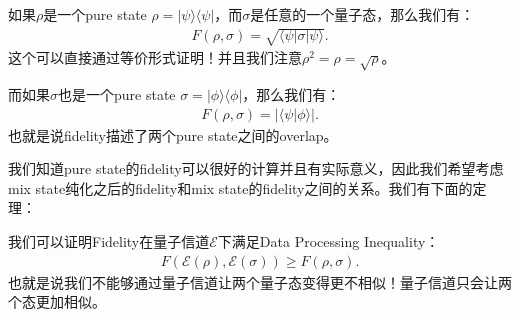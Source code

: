   \bigskip

  如果$ \rho $是一个pure state $ \rho = |\psi\rangle\langle\psi| $，而$
  \sigma $是任意的一个量子态，那么我们有：
  \begin{align}
    F(\rho,\sigma) = \sqrt{\langle\psi|\sigma|\psi\rangle}.
  \end{align}
  这个可以直接通过等价形式证明！并且我们注意$ \rho^2 = \rho = \sqrt{\rho} $。

  而如果$ \sigma $也是一个pure state $ \sigma = |\phi\rangle\langle\phi| $，那么我们有：
  \begin{align}
    F(\rho,\sigma) = |\langle\psi|\phi\rangle|.
  \end{align}
  也就是说fidelity描述了两个pure state之间的overlap。

  \bigskip

  我们知道pure state的fidelity可以很好的计算并且有实际意义，因此我们希望考虑mix
  state纯化之后的fidelity和mix state的fidelity之间的关系。我们有下面的定理：

  \bigskip

  我们可以证明Fidelity在量子信道$ \mathcal{E} $下满足Data Processing Inequality：
  \begin{align}
    F(\mathcal{E}(\rho),\mathcal{E}(\sigma)) \geq F(\rho,\sigma).
  \end{align}
  也就是说我们不能够通过量子信道让两个量子态变得更不相似！量子信道只会让两个态更加相似。
